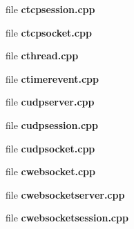 \begin{DoxyCompactItemize}
\begin{DoxyCompactList}
 \end{DoxyCompactList}\item 
file {\bf ctcpsession.\-cpp}
\begin{DoxyCompactList}\small\item\em 

 \end{DoxyCompactList}\item 
file {\bf ctcpsocket.\-cpp}
\begin{DoxyCompactList}\small\item\em 

 \end{DoxyCompactList}\item 
file {\bf cthread.\-cpp}
\item 
file {\bf ctimerevent.\-cpp}
\item 
file {\bf cudpserver.\-cpp}
\item 
file {\bf cudpsession.\-cpp}
\item 
file {\bf cudpsocket.\-cpp}
\item 
file {\bf cwebsocket.\-cpp}
\item 
file {\bf cwebsocketserver.\-cpp}
\begin{DoxyCompactList}\small\item\em 

 \end{DoxyCompactList}\item 
file {\bf cwebsocketsession.\-cpp}
\begin{DoxyCompactList}\small\item\em 

 \end{DoxyCompactList}\end{DoxyCompactItemize}
